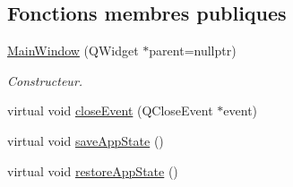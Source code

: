 \subsection*{Fonctions membres publiques}
\begin{DoxyCompactItemize}
\item 
\hyperlink{class_main_window_a996c5a2b6f77944776856f08ec30858d}{Main\+Window} (Q\+Widget $\ast$parent=nullptr)
\begin{DoxyCompactList}\small\item\em Constructeur. \end{DoxyCompactList}\item 
virtual void \hyperlink{class_main_window_a4e20a4a065fbb0e4d3532a45a0a91425}{close\+Event} (Q\+Close\+Event $\ast$event)
\item 
virtual void \hyperlink{class_main_window_a94b693e3fa35f35ba200d2427b9cd419}{save\+App\+State} ()
\item 
virtual void \hyperlink{class_main_window_ab1dbe77cfb9a4876733a540614afdec0}{restore\+App\+State} ()
\end{DoxyCompactItemize}
